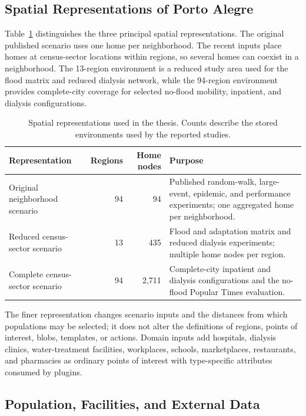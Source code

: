 \documentclass[pdflatex,sn-mathphys-num]{sn-jnl}%
\theoremstyle{thmstyleone}%
\theoremstyle{thmstyletwo}%
\theoremstyle{thmstylethree}%
\begin{document}
\subsection{Spatial Representations of Porto Alegre}
\label{evaluation:spatial}

Table~\ref{tbl:spatial_representations} distinguishes the three principal spatial representations. The original published scenario uses one home per neighborhood. The recent inputs place homes at census-sector locations within regions, so several homes can coexist in a neighborhood. The 13-region environment is a reduced study area used for the flood matrix and reduced dialysis network, while the 94-region environment provides complete-city coverage for selected no-flood mobility, inpatient, and dialysis configurations.

\begin{table}[ht]
\centering
\footnotesize
\caption{Spatial representations used in the thesis. Counts describe the stored environments used by the reported studies.}
\label{tbl:spatial_representations}
\begin{tabularx}{\linewidth}{@{}lrrX@{}}
\toprule
\textbf{Representation} & \textbf{Regions} & \textbf{Home nodes} & \textbf{Purpose} \\ \midrule
Original neighborhood scenario & 94 & 94 & Published random-walk, large-event, epidemic, and performance experiments; one aggregated home per neighborhood. \\ \midrule
Reduced census-sector scenario & 13 & 435 & Flood and adaptation matrix and reduced dialysis experiments; multiple home nodes per region. \\ \midrule
Complete census-sector scenario & 94 & 2,711 & Complete-city inpatient and dialysis configurations and the no-flood Popular Times evaluation. \\ \bottomrule
\end{tabularx}
\end{table}

The finer representation changes scenario inputs and the distances from which populations may be selected; it does not alter the definitions of regions, points of interest, blobs, templates, or actions. Domain inputs add hospitals, dialysis clinics, water-treatment facilities, workplaces, schools, marketplaces, restaurants, and pharmacies as ordinary points of interest with type-specific attributes consumed by plugins.

\subsection{Population, Facilities, and External Data}
\end{document}
